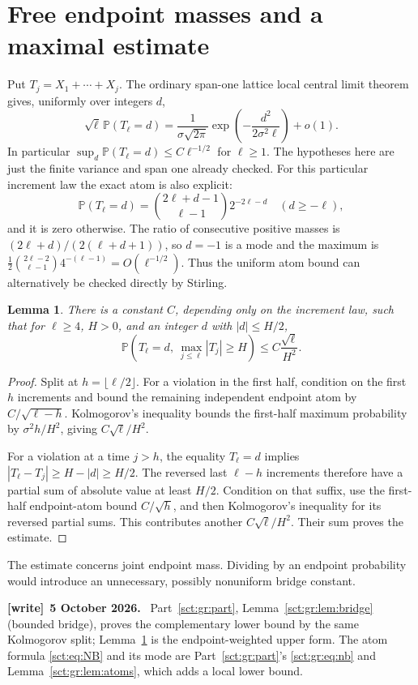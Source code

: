 \documentclass[11pt,letterpaper]{article}
\newtheorem{lemma}[theorem]{Lemma}
\theoremstyle{definition}\newtheorem{remark}[theorem]{Remark}
\newcommand{\Pp}{\mathbb P}\newcommand{\Ee}{\mathbb E}
\newenvironment{writenote}[1][]{\par\smallskip\begingroup\small
 \noindent\textbf{[write]}\if\relax\detokenize{#1}\relax\else~\textbf{#1.}\fi\ }%
 {\par\endgroup\smallskip}
\begin{document}
\section{Free endpoint masses and a maximal estimate}\label{sct:sec:bridge}
Put $T_j=X_1+\cdots+X_j$. The ordinary span-one lattice local central limit
theorem gives, uniformly over integers $d$,
\begin{equation}\label{sct:eq:LCLT}
 \sqrt\ell\,\Pp(T_\ell=d)=
 \frac1{\sigma\sqrt{2\pi}}
 \exp\left(-\frac{d^2}{2\sigma^2\ell}\right)+o(1).
\end{equation}
In particular $\sup_d\Pp(T_\ell=d)\le C\ell^{-1/2}$ for $\ell\ge1$.
The hypotheses here are just the finite variance and span one already checked.
For this particular increment law the exact atom is also explicit:
\begin{equation}\label{sct:eq:NB}
 \Pp(T_\ell=d)=\binom{2\ell+d-1}{\ell-1}2^{-2\ell-d}\quad(d\ge-\ell),
\end{equation}
and it is zero otherwise. The ratio of consecutive positive masses is
$(2\ell+d)/(2(\ell+d+1))$, so $d=-1$ is a mode and the maximum is
$\frac12\binom{2\ell-2}{\ell-1}4^{-(\ell-1)}=O(\ell^{-1/2})$.
Thus the uniform atom bound can alternatively be checked directly by Stirling.

\begin{lemma}\label{sct:lem:max}
There is a constant $C$, depending only on the increment law, such that for
$\ell\ge4$, $H>0$, and an integer $d$ with $|d|\le H/2$,
\begin{equation}\label{sct:eq:max}
 \Pp\left(T_\ell=d,\ \max_{j\le\ell}|T_j|\ge H\right)
 \le C\frac{\sqrt\ell}{H^2}.
\end{equation}
\end{lemma}
\begin{proof}
Split at $h=\lfloor\ell/2\rfloor$. For a violation in the first half, condition
on the first $h$ increments and bound the remaining independent endpoint atom
by $C/\sqrt{\ell-h}$. Kolmogorov's inequality bounds the first-half maximum
probability by $\sigma^2h/H^2$, giving $C\sqrt\ell/H^2$.

For a violation at a time $j>h$, the equality $T_\ell=d$ implies
$|T_\ell-T_j|\ge H-|d|\ge H/2$. The reversed last $\ell-h$ increments
therefore have a partial sum of absolute value at least $H/2$. Condition on
that suffix, use the first-half endpoint-atom bound $C/\sqrt h$, and then
Kolmogorov's inequality for its reversed partial sums. This contributes
another $C\sqrt\ell/H^2$. Their sum proves the estimate.
\end{proof}
The estimate concerns joint endpoint mass. Dividing by an endpoint probability
would introduce an unnecessary, possibly nonuniform bridge constant.
\begin{writenote}[5 October 2026]
Part~\ref{sct:gr:part}, Lemma~\ref{sct:gr:lem:bridge} (bounded bridge), proves the complementary lower bound by the same Kolmogorov split; Lemma~\ref{sct:lem:max} is the endpoint-weighted upper form. The atom formula \eqref{sct:eq:NB} and its mode are Part~\ref{sct:gr:part}'s \eqref{sct:gr:eq:nb} and Lemma~\ref{sct:gr:lem:atoms}, which adds a local lower bound.
\end{writenote}
\end{document}
